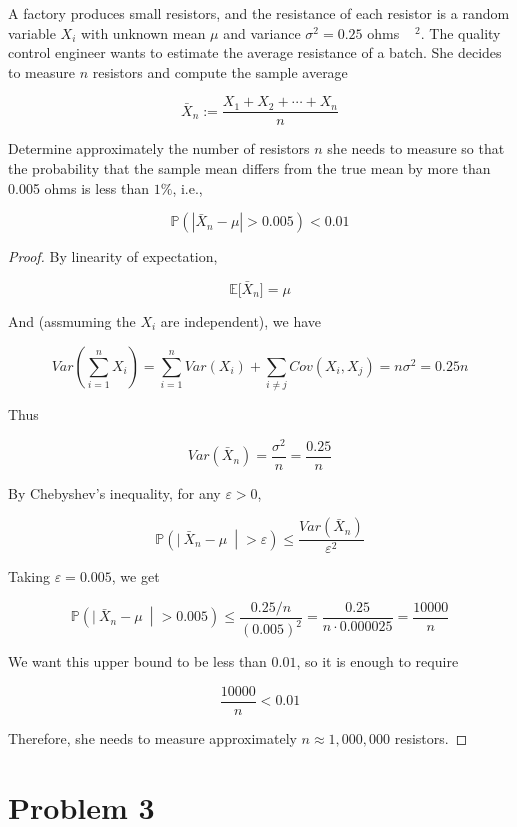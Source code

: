 \documentclass{qlnotes-export}
\begin{document}
A factory produces small resistors, and the resistance of each resistor is a random variable \(X_{i}\) with unknown mean \(\mu\) and variance \(\sigma^{2} = 0.25\) ohms \(\begin{matrix}
\end{matrix}^{2}\). The quality control engineer wants to estimate the average resistance of a batch. She decides to measure \(n\) resistors and compute the sample average

\[{\bar{X}}_{n} := \frac{X_{1} + X_{2} + \cdots + X_{n}}{n}\]

Determine approximately the number of resistors \(n\) she needs to measure so that the probability that the sample mean differs from the true mean by more than 0.005 ohms is less than \(1\%\), i.e.,

\[{\mathbb{P}}\left( {\left| {{\bar{X}}_{n} - \mu} \right| > 0.005} \right) < 0.01\]

\begin{proof}

By linearity of expectation,

\[{\mathbb{E}}\lbrack{\bar{X}}_{n}\rbrack = \mu\]

And (assmuming the \(X_{i}\) are independent), we have

\[Var\left( {\sum\limits_{i = 1}^{n}X_{i}} \right) = \sum\limits_{i = 1}^{n}Var(X_{i}) + \sum\limits_{i \neq j}Cov(X_{i},X_{j}) = n\sigma^{2} = 0.25n\]

Thus

\[Var({\bar{X}}_{n}) = \frac{\sigma^{2}}{n} = \frac{0.25}{n}\]

By Chebyshev's inequality, for any \(\varepsilon > 0\),

\[{\mathbb{P}}\left( |\ {\bar{X}}_{n} - \mu\  \middle| > \varepsilon \right) \leq \frac{Var({\bar{X}}_{n})}{\varepsilon^{2}}\]

Taking \(\varepsilon = 0.005\), we get

\[{\mathbb{P}}\left( |\ {\bar{X}}_{n} - \mu\  \middle| > 0.005 \right) \leq \frac{0.25/n}{(0.005)^{2}} = \frac{0.25}{n \cdot 0.000025} = \frac{10000}{n}\]

We want this upper bound to be less than \(0.01\), so it is enough to require

\[\frac{10000}{n} < 0.01\]

Therefore, she needs to measure approximately \(n \approx 1,000,000\) resistors.

\end{proof}

\section{Problem 3}\label{problem-3-5}
\end{document}
